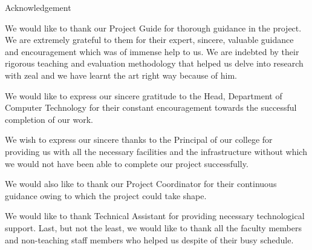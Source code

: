 
\begin{acknowledgement}
    
    \begin{center}
        \huge{Acknowledgement}
    \end{center}

    \addmargin
    
    \vspace{2 em}
    
    We would like to thank our Project Guide for thorough guidance in the project. We are extremely grateful to them for their expert, sincere, valuable guidance and encouragement which was of immense help to us. We are indebted by their rigorous teaching and evaluation methodology that helped us delve into research with zeal and we have learnt the art right way because of him.\newline
    
    We would like to express our sincere gratitude to the Head, Department of Computer Technology for their constant encouragement towards the successful completion of our work.\newline
    
    We wish to express our sincere thanks to the Principal of our college for providing us with all the necessary facilities and the infrastructure without which we would not have been able to complete our project successfully.\newline
    
    We would also like to thank our Project Coordinator for their continuous guidance owing to which the project could take shape.\newline
    
    We would like to thank Technical Assistant for providing necessary technological support. Last, but not the least, we would like to thank all the faculty members and non-teaching staff members who helped us despite of their busy schedule.
    
\end{acknowledgement}